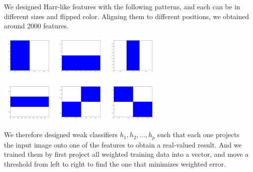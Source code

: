 \documentclass[12pt]{article}
\newenvironment{p1}[2][II Feature and Weak Classifier Design]{\begin{trivlist}
\item[\hskip \labelsep {\bfseries #1}\hskip \labelsep {\bfseries #2}]}{\end{trivlist}}
\begin{document}
\begin{p1}{}
\item{}
We designed Harr-like features with the following patterns, and each can be in different sizes and flipped color. Aligning them to different positions, we obtained around 2000 features.
\begin{center}
		\includegraphics[height=2cm]{features/rec2_1.jpg}
		\includegraphics[height=2cm]{features/rec2_2.jpg}
		\includegraphics[height=2cm]{features/rec3_1.jpg}
\end{center}
\begin{center}
		\includegraphics[height=2cm]{features/rec3_2.jpg}
		\includegraphics[height=2cm]{features/rec4_1.jpg}
		\includegraphics[height=2cm]{features/rec4_2.jpg}
\end{center}
\item{}
We therefore designed weak classifiers $h_1, h_2, ..., h_p$ such that each one projects the input image onto one of the features to obtain a real-valued result. And we trained them by first project all weighted training data into a vector, and move a threshold from left to right to find the one that minimizes weighted error.
\end{p1}
\end{document}
